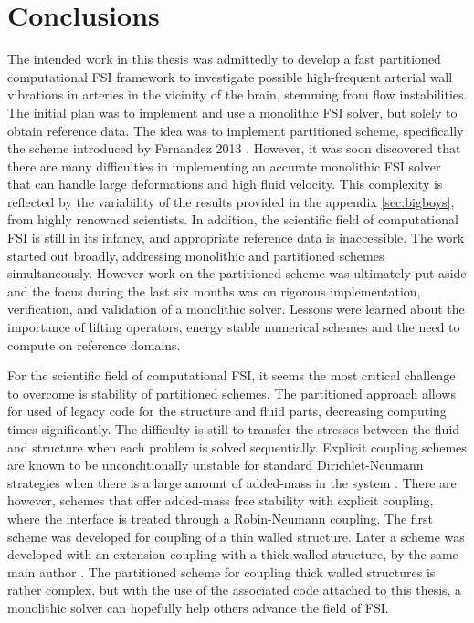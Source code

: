 \chapter{Conclusions}
The intended work in this thesis was admittedly to develop a fast partitioned computational FSI framework to investigate possible high-frequent arterial wall vibrations in arteries in the vicinity of the brain, stemming from flow instabilities. The initial plan was to implement and use a monolithic FSI solver, but solely to obtain reference data. The idea was to implement partitioned scheme, specifically the scheme introduced by Fernandez 2013 \cite{Fernandez2013}. However, it was soon discovered that there are many difficulties in implementing an accurate monolithic FSI solver that can handle large deformations and high fluid velocity. This complexity is reflected by the variability of the results provided in the appendix \ref{sec:bigboys}, from highly renowned scientists. In addition, the scientific field of computational FSI is still in its infancy, and appropriate reference data is inaccessible. The work started out broadly, addressing monolithic and partitioned schemes simultaneously. However work on the partitioned scheme was ultimately put aside and the focus during the last six months was on rigorous implementation, verification, and validation of a monolithic solver. Lessons were learned about the importance of lifting operators, energy stable numerical schemes and the need to compute on reference domains.

For the scientific field of computational FSI, it seems the most critical challenge to overcome is stability of partitioned schemes. The partitioned approach allows for used of legacy code for the structure and fluid parts, decreasing computing times significantly. The difficulty is still to transfer the stresses between the fluid and structure when each problem is solved sequentially. Explicit coupling schemes are known to be unconditionally unstable for standard Dirichlet-Neumann strategies when there is a large amount of added-mass in the system \cite{Fernandez2015, VanBrummelen2009}. There are however, schemes that offer added-mass free stability with explicit coupling, where the interface is treated through a Robin-Neumann coupling. The first scheme was developed for coupling of a thin walled structure\cite{Fernandez2013}. Later a scheme was developed with an extension coupling with a thick walled structure, by the same main author \cite{Fernandez2015}. The partitioned scheme for coupling thick walled structures is rather complex, but with the use of the associated code attached to this thesis, a monolithic solver can hopefully help others advance the field of FSI. 
